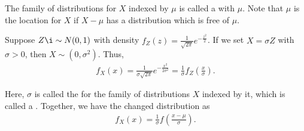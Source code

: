The family of distributions for $X$ indexed by $\mu$ is called a  with  $\mu$. Note that $\mu$ is the location for $X$ if $X-\mu$ has a distribution which is free of $\mu$.

\begin{example}
    Suppose $Z \i\sim N(0,1)$ with density $f_{Z}(z) = \frac{1}{\sqrt{2\pi}} e^{-\frac{z^{2}}{2}}$. If we set $X = \sigma Z$ with $\sigma > 0$, then $X \sim (0,\sigma^{2})$. Thus,
    \begin{align}
        f_{X}(x) = \frac{1}{\sigma\sqrt{2\pi}} e^{-\frac{x^{2}}{2\sigma^{2}}} = \frac{1}{\sigma} f_{Z}(\frac{x}{\sigma}).
    \end{align}
\end{example}

Here, $\sigma$ is called the  for the family of distributions $X$ indexed by it, which is called a . Together, we have the changed distribution as
\begin{align}
    f_{X}(x) = \frac{1}{\sigma} f\left( \frac{x-\mu}{\sigma} \right).
\end{align}